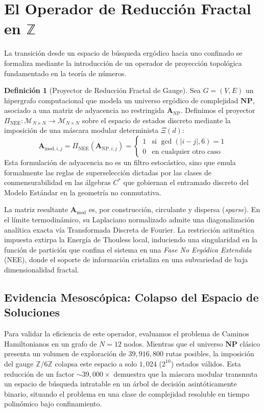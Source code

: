 \documentclass[sn-mathphys]{sn-jnl}
\theoremstyle{definition} %
\newtheorem{definition}[theorem]{Definición}
\newcommand{\Z}{\mathbb{Z}}
\newcommand{\Zmod}{\mathbb{Z}/6\mathbb{Z}}
\begin{document}
\section{El Operador de Reducción Fractal en \texorpdfstring{$\Z$}{Z}}

La transición desde un espacio de búsqueda ergódico hacia uno confinado se formaliza mediante la introducción de un operador de proyección topológica fundamentado en la teoría de números.

\begin{definition}[Proyector de Reducción Fractal de Gauge]
Sea $G = (V, E)$ un hipergrafo computacional que modela un universo ergódico de complejidad $\mathbf{NP}$, asociado a una matriz de adyacencia no restringida $\mathbf{A}_{\text{NP}}$. Definimos el proyector $\Pi_{\text{NEE}}: \mathcal{M}_{N \times N} \to \mathcal{M}_{N \times N}$ sobre el espacio de estados discreto mediante la imposición de una máscara modular determinista $\Xi(d)$:
\begin{equation}
\mathbf{A}_{\text{mod}, i,j} = \Pi_{\text{NEE}} (\mathbf{A}_{\text{NP}, i,j}) = 
\begin{cases} 
1 & \text{si } \gcd(|i - j|, 6) = 1 \\
0 & \text{en cualquier otro caso}
\end{cases}
\end{equation}
Esta formulación de adyacencia no es un filtro estocástico, sino que emula formalmente las reglas de superselección dictadas por las clases de conmensurabilidad en las álgebras $C^*$ que gobiernan el entramado discreto del Modelo Estándar en la geometría no conmutativa.
\end{definition}

La matriz resultante $\mathbf{A}_{\text{mod}}$ es, por construcción, circulante y dispersa (\textit{sparse}). En el límite termodinámico, su Laplaciano normalizado admite una diagonalización analítica exacta vía Transformada Discreta de Fourier. La restricción aritmética impuesta extirpa la Energía de Thouless local, induciendo una singularidad en la función de partición que confina el sistema en una \textit{Fase No Ergódica Extendida} (NEE), donde el soporte de información cristaliza en una subvariedad de baja dimensionalidad fractal.

\subsection{Evidencia Mesoscópica: Colapso del Espacio de Soluciones}
Para validar la eficiencia de este operador, evaluamos el problema de Caminos Hamiltonianos en un grafo de $N=12$ nodos. Mientras que el universo $\mathbf{NP}$ clásico presenta un volumen de exploración de $39,916,800$ rutas posibles, la imposición del gauge $\Zmod$ colapsa este espacio a solo $1,024$ ($2^{10}$) estados válidos. Esta reducción de un factor $\sim 39,000\times$ demuestra que la máscara modular transmuta un espacio de búsqueda intratable en un árbol de decisión asintóticamente binario, situando el problema en una clase de complejidad resoluble en tiempo polinómico bajo confinamiento.
\end{document}
